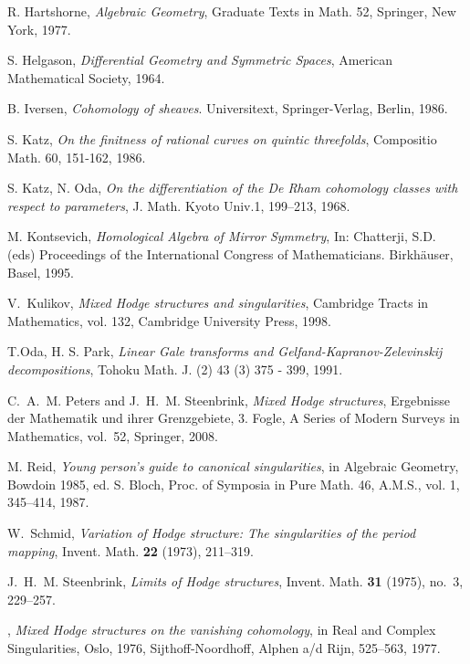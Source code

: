 \documentclass{article}
\numberwithin{equation}{section}
\begin{document}
\begin{thebibliography}{70}
R. Hartshorne, \emph{Algebraic Geometry}, Graduate Texts in Math. 52, Springer, New York, 1977.


S. Helgason, \emph{Differential Geometry and Symmetric Spaces}, American Mathematical Society, 1964.


B. Iversen, \emph{Cohomology of sheaves}. Universitext, Springer-Verlag, Berlin, 1986.


 S. Katz, \emph{On the finitness of rational curves on quintic threefolds}, Compositio Math. 60, 151-162, 1986.

S. Katz, N. Oda, \emph{On the differentiation of the De Rham cohomology classes with respect to parameters}, J. Math. Kyoto Univ.1, 199–213, 1968.

M. Kontsevich, \emph{Homological Algebra of Mirror Symmetry}, In: Chatterji, S.D. (eds) Proceedings of the International Congress of Mathematicians. Birkhäuser, Basel, 1995.


V.~Kulikov, \emph{Mixed {H}odge structures and singularities}, Cambridge Tracts
  in Mathematics, vol. 132, Cambridge University Press, 1998.


T.Oda, H. S. Park, \emph{Linear Gale transforms and Gelfand-Kapranov-Zelevinskij decompositions}, Tohoku Math. J. (2) 43 (3) 375 - 399, 1991.

C.~A.~M. Peters and J.~H.~M. Steenbrink, \emph{Mixed {H}odge structures},
  Ergebnisse der Mathematik und ihrer Grenzgebiete, 3. Fogle, A Series of
  Modern Surveys in Mathematics, vol.~52, Springer, 2008.


   M. Reid, \emph{Young person’s guide to canonical singularities}, in Algebraic Geometry, Bowdoin 1985, ed. S. Bloch, Proc. of Symposia in Pure Math. 46, A.M.S., vol. 1, 345–414, 1987.

  
W.~Schmid, \emph{Variation of {H}odge structure: The singularities of the
  period mapping}, Invent. Math. \textbf{22} (1973), 211--319.



J.~H.~M. Steenbrink, \emph{Limits of {H}odge structures}, Invent. Math.
  \textbf{31} (1975), no.~3, 229--257.


\bysame, \emph{Mixed Hodge structures on the vanishing cohomology}, in Real and Complex Singularities, Oslo, 1976, Sijthoff-Noordhoff, Alphen a/d Rijn, 525–563, 1977.




\end{thebibliography}
\end{document}
